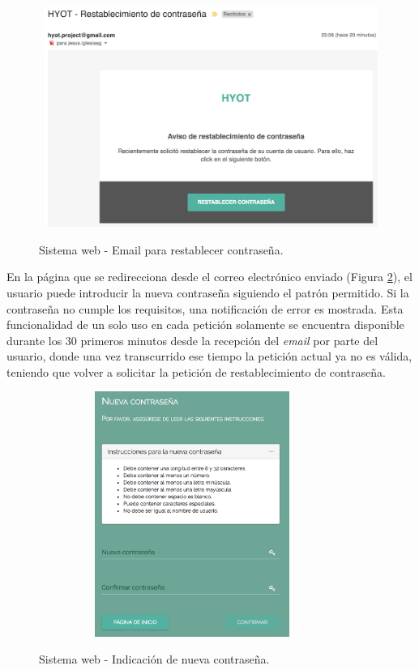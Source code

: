 \documentclass[12pt,a4paper, twoside]{report}
\begin{document}
		\newpage

		\begin{figure}[!ht]   
			\caption{Sistema web - Email para restablecer contraseña.} 
			\begin{center} 
	 			\includegraphics[width=12cm, height=7.2cm]{Images/userGuide/web/restorePasswordMail} \\
				\label{fig:web_restoreEmail} 
			\end{center}  	
		\end{figure}	
	
	En la página que se redirecciona desde el correo electrónico enviado (Figura \ref{fig:web_newPassword}), el usuario puede introducir la nueva contraseña siguiendo el patrón permitido. Si la contraseña no cumple los requisitos, una notificación de error es mostrada. Esta funcionalidad de un solo uso en cada petición solamente se encuentra disponible durante los 30 primeros minutos desde la recepción del \textit{email} por parte del usuario, donde una vez transcurrido ese tiempo la petición actual ya no es válida, teniendo que volver a solicitar la petición de restablecimiento de contraseña.
	
		\begin{figure}[!ht]   
			\caption{Sistema web - Indicación de nueva contraseña.} 
			\begin{center} 
	 			\includegraphics[width=10cm, height=8cm]{Images/userGuide/web/newPassword} \\
				\label{fig:web_newPassword} 
			\end{center}  	
		\end{figure}
\end{document}
